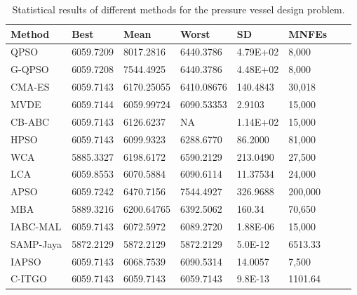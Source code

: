 
\begin{table*}[tp]
    \tiny
    \begin{center}
    
    \begin{tabular}{ P{2.0cm} P{2.0cm} P{2.0cm} P{2.0cm} P{2.0cm} P{2.0cm} P{2.0cm} P{2.0cm}  }
    \hline
    \textbf{Method} & \textbf{Best} & \textbf{Mean} & \textbf{Worst} & \textbf{SD} & \textbf{MNFEs} \\
    \hline
    
    QPSO & 6059.7209 & 8017.2816 & 6440.3786 & 4.79E+02 & 8,000 \\
    G-QPSO & 6059.7208 & 7544.4925 & 6440.3786 & 4.48E+02 & 8,000 \\
    CMA-ES & 6059.7143 & 6170.25055 & 6410.08676 & 140.4843 & 30,018 \\
    MVDE & 6059.7144 & 6059.99724 & 6090.53353 & 2.9103 & 15,000 \\ 
    CB-ABC & 6059.7143 & 6126.6237 & NA & 1.14E+02 & 15,000 \\
    HPSO & 6059.7143 & 6099.9323 & 6288.6770 & 86.2000 & 81,000 \\
    WCA & 5885.3327 & 6198.6172 & 6590.2129 & 213.0490 & 27,500 \\
    LCA & 6059.8553 & 6070.5884 & 6090.6114 & 11.37534 & 24,000 \\
    APSO & 6059.7242 & 6470.7156 & 7544.4927 & 326.9688 & 200,000 \\
    MBA & 5889.3216 & 6200.64765 & 6392.5062 & 160.34 & 70,650 \\    
    IABC-MAL & 6059.7143 & 6072.5972 & 6089.2720 & 1.88E-06 & 15,000 \\
    SAMP-Jaya & 5872.2129 & 5872.2129 & 5872.2129 & 5.0E-12 & 6513.33 \\    
    IAPSO & 6059.7143 & 6068.7539 & 6090.5314 & 14.0057 & 7,500 \\
    C-ITGO & 6059.7143 & 6059.7143 & 6059.7143 & 9.8E-13 & 1101.64 \\
    
    \hline
    \end{tabular}
    \end{center}
    
    \caption{ Statistical results of different methods for the pressure vessel design problem. \\[1em]}
    \label{tab:PV}
    \end{table*}
    
    